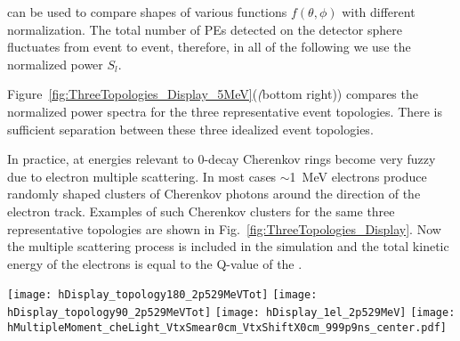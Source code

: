 can be used to compare shapes of various functions $f(\theta,\phi)$ with different normalization. The total number of PEs detected on the detector sphere fluctuates from event to event, therefore, in all of the following we use the normalized power $S_l$.

Figure~\ref{fig:ThreeTopologies_Display_5MeV}(\emph(bottom right)) compares the normalized power spectra for the three representative event topologies.
There is sufficient separation between these three idealized event topologies.

In practice, at energies relevant to 0\nbb-decay Cherenkov rings become very fuzzy due to electron multiple scattering. In most cases $\sim$1~MeV 
electrons produce randomly shaped clusters of Cherenkov photons around the direction of the electron track. Examples of such Cherenkov clusters
for the same three representative topologies are shown in Fig.~\ref{fig:ThreeTopologies_Display}. Now the multiple scattering process is included 
in the simulation and the total kinetic energy of the electrons is equal to the Q-value of the \Te.


\begin{figure*}[h]
  \centering
  \texttt{[image: hDisplay\_topology180\_2p529MeVTot]}
  \texttt{[image: hDisplay\_topology90\_2p529MeVTot]}
  \texttt{[image: hDisplay\_1el\_2p529MeV]}
  \texttt{[image: hMultipleMoment\_cheLight\_VtxSmear0cm\_VtxShiftX0cm\_999p9ns\_center.pdf]}
  \caption{\emph{Top panels and bottom left panel:} Event displays for the three representative event topologies with the electron energies relevant 
    for the {\Te} 0{\nbb}-decay: two back-to-back 1.26~MeV electrons (\emph{top left}), two 1.26~MeV electrons at 90$^{\circ}$ angle 
    (\emph{top right}), and a single 2.53~MeV electron (\emph{bottom left}). Multiple scattering is now properly included in the simulation
    For the illustration purposes 100\% QE is applied to Cherenkov photons (triangles) and the default QE is applied to scintillation 
    photons (dots). All electrons originate at the center of the detector. One typical event is shown for each topology.
    \emph{Bottom right panel:} Normalized power spectrum $S_l$ calculated for distribution of Cherenkov photons only. The three
    topologies are compared: two back-to-back 1.26~MeV electrons (\emph{solid red line}), two 1.26~MeV electrons at 90$^{\circ}$ angle
    (\emph{dotted magenta line}), and a single 2.53~MeV electron (\emph{dashed blue line}). For each topology 1000 events were simulated.
    The normalized power values $S_l$'s were calculated for each individual event. The horizontal lines correspond to the mean values of
    $S_l$ within each event topology. The vertical bars show one standard deviation from the mean value.}
  \label{fig:ThreeTopologies_Display}
\end{figure*}


